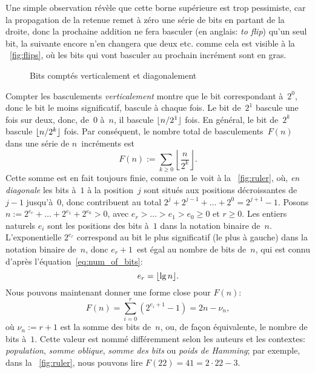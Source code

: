 Une simple observation révèle que cette borne supérieure est trop
pessimiste, car la propagation de la retenue remet à zéro une série de
bits en partant de la droite, donc la prochaine addition ne fera
basculer (en anglais: \emph{to flip}) qu'un seul bit, la suivante
encore n'en changera que deux etc. comme cela est visible à la
\fig~\vref{fig:flips}, où les bits qui vont basculer au prochain
incrément sont en gras.
\begin{figure}[t]
\centering
{}
\qquad
{}
\caption{Bits comptés verticalement et diagonalement}
\end{figure}
Compter les basculements \emph{verticalement} montre que le bit
correspondant à~\(2^0\), donc le bit le moins significatif, bascule à
chaque fois. Le bit de~\(2^1\) bascule une fois sur deux, donc,
de~\(0\) à~\(n\), il bascule \(\lfloor{n/2^1}\rfloor\) fois. En général, le
bit de~\(2^k\) bascule \(\lfloor{n/2^k}\rfloor\) fois. Par conséquent, le
nombre total de basculements~\(F(n)\) dans une série de
\(n\)~incréments est
\begin{equation}
F(n) := \sum_{k \geqslant 0}{\left\lfloor\frac{n}{2^k}\right\rfloor}.
\label{eq:F}
\end{equation}
Cette somme est en fait toujours finie, comme on le voit à la
\fig~\vref{fig:ruler}, où, \emph{en diagonale} les bits à~\(1\) à la
position~\(j\) sont situés aux positions décroissantes de~\(j-1\)
jusqu'à~\(0\), donc contribuent au total \(2^j + 2^{j-1} + \dots + 2^0
= 2^{j+1}-1\).  Posons \(n := 2^{e_r} + \dots + 2^{e_1} + 2^{e_0} >
0\), avec \(e_r > \dots > e_1 > e_0 \geqslant 0\) et \(r \geqslant
0\). Les entiers naturels \(e_i\) sont les positions des bits à~\(1\)
dans la notation binaire de~\(n\). L'exponentielle \(2^{e_r}\)
correspond au bit le plus significatif (le plus à gauche) dans la
notation binaire de~\(n\), donc \(e_r+1\)~est égal au nombre de bits
de~\(n\), qui est connu d'après l'équation~\eqref{eq:num_of_bits}:
\begin{equation}
e_r = \lfloor{\lg n}\rfloor.\label{eq:e_r}
\end{equation}
Nous pouvons maintenant donner une forme close pour \(F(n)\):
\begin{equation}
F(n) = \sum_{i=0}^{r}(2^{e_i+1} - 1) = 2n - \nu_n,
\label{eq:ruler_nu}
\end{equation}
où \(\nu_n := r + 1\) est la somme des bits de~\(n\), ou, de façon équivalente,
le nombre de bits à~\(1\). Cette valeur est nommé différemment selon
les auteurs et les contextes: \emph{population}, \emph{somme oblique},
\emph{somme des bits} ou \emph{poids de
  Hamming}; par exemple, dans la \fig~\vref{fig:ruler}, nous pouvons
lire \(F(22) = 41 = 2 \cdot 22 - 3\).

